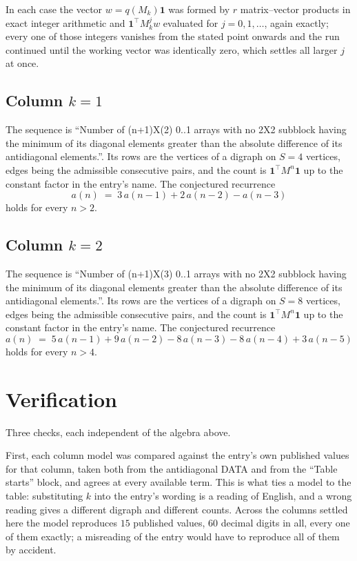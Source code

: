 \documentclass[11pt,a4paper]{article}
\theoremstyle{plain}
\theoremstyle{definition}
\begin{document}
In each case the vector $w=q(M_k)\mathbf{1}$ was formed by $r$ matrix--vector products in
exact integer arithmetic and $\mathbf{1}^{\!\top}M_k^{j}w$ evaluated for $j=0,1,\dots$,
again exactly; every one of those integers vanishes from the stated point onwards and the run
continued until the working vector was identically zero, which settles all larger $j$ at once.

\subsection*{Column $k=1$}
The sequence is ``Number of (n+1)X(2) 0..1 arrays with no 2X2 subblock having the minimum of its diagonal elements greater than the absolute difference of its antidiagonal elements.''. Its rows are the vertices of a digraph on
$S=4$ vertices, edges being the admissible consecutive pairs, and the count is
$\mathbf{1}^{\!\top}M^{n}\mathbf{1}$ up to the constant factor in the entry's name.
The conjectured recurrence
\[
a(n)\;=\;3\,a(n-1) + 2\,a(n-2) - a(n-3)
\]
holds for every $n>2$.

\subsection*{Column $k=2$}
The sequence is ``Number of (n+1)X(3) 0..1 arrays with no 2X2 subblock having the minimum of its diagonal elements greater than the absolute difference of its antidiagonal elements.''. Its rows are the vertices of a digraph on
$S=8$ vertices, edges being the admissible consecutive pairs, and the count is
$\mathbf{1}^{\!\top}M^{n}\mathbf{1}$ up to the constant factor in the entry's name.
The conjectured recurrence
\[
a(n)\;=\;5\,a(n-1) + 9\,a(n-2) - 8\,a(n-3) - 8\,a(n-4) + 3\,a(n-5)
\]
holds for every $n>4$.

\section{Verification}

Three checks, each independent of the algebra above.

First, each column model was compared against the entry's own published values for that
column, taken both from the antidiagonal DATA and from the ``Table starts'' block, and agrees
at every available term. This is what ties a model to the table: substituting $k$ into the
entry's wording is a reading of English, and a wrong reading gives a different digraph and
different counts. Across the columns settled here the model reproduces $15$ published
values, $60$ decimal digits in all, every one of them exactly; a misreading of the entry
would have to reproduce all of them by accident.
\end{document}
